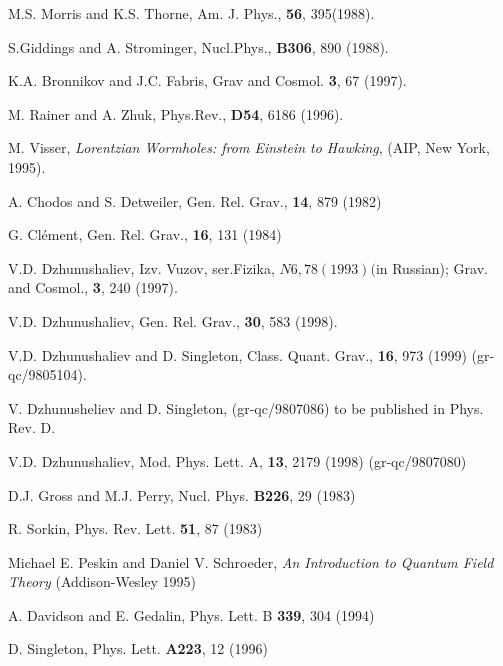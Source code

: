  \begin{references}  %

M.S. Morris and K.S. Thorne, Am. J. Phys., 
{\bf 56}, 395(1988). 

S.Giddings and A. Strominger, Nucl.Phys., {\bf B306}, 
890 (1988).

K.A. Bronnikov and J.C. Fabris, Grav and Cosmol. 
{\bf 3}, 67 (1997).

M. Rainer and A. Zhuk, Phys.Rev., {\bf D54}, 6186 (1996). 

M. Visser, {\it Lorentzian Wormholes: from Einstein to 
Hawking}, (AIP, New York, 1995).

A. Chodos and S. Detweiler, Gen. Rel. Grav.,
{\bf 14}, 879 (1982)

G. Cl\'ement, Gen. Rel. Grav., {\bf 16}, 131 (1984) 

V.D. Dzhunushaliev, Izv.  Vuzov,  ser.Fizika, $N6, 78 (1993) 
($in Russian); Grav. and Cosmol., {\bf 3}, 240 (1997). 

V.D. Dzhunushaliev, Gen. Rel. Grav., {\bf 30}, 583 (1998). 

V.D. Dzhunushaliev and D. Singleton, Class. Quant. Grav.,
{\bf 16}, 973 (1999) (gr-qc/9805104).

 V. Dzhunusheliev and D. Singleton, (gr-qc/9807086)
to be published in Phys. Rev. D.

V.D. Dzhunushaliev, Mod. Phys. Lett. A, {\bf 13}, 2179
(1998) (gr-qc/9807080)

D.J. Gross and M.J. Perry, Nucl. Phys. {\bf B226}, 29 (1983)

R. Sorkin, Phys. Rev. Lett. {\bf 51}, 87 (1983)

Michael E. Peskin and Daniel V. Schroeder, 
{\it An Introduction to Quantum Field Theory} 
(Addison-Wesley 1995) 

A. Davidson and E. Gedalin, Phys. Lett. B {\bf 339}, 304 (1994)

D. Singleton, Phys. Lett. {\bf A223}, 12 (1996)

\end{references}





